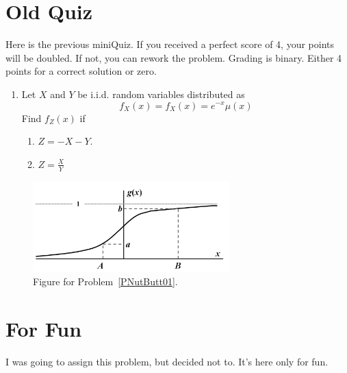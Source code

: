 \documentclass{article}[10pt]
\begin{document}
\section{Old Quiz}

Here is the previous miniQuiz. If you received a perfect score of 4, your points will be doubled. If not, you can rework the problem. Grading is binary. Either 4 points for a correct solution or zero.

\begin{enumerate}
\item
  Let $X$ and $Y$ be i.i.d. random variables distributed as
  $$ f_X(x) = f_X(x) = e^{-x} \mu (x)$$
  Find $f_Z (x)$ if
  \begin{enumerate}
  \item $Z=-X-Y$.
  \item $Z=\frac{X}{Y}$
  \end{enumerate}
\end{enumerate}

\begin{figure}
  \centering
  \includegraphics[width=3in]{pics/PROB.png}
  \caption{Figure for Problem~\ref{PNutButt01}.}
  \label{PNutButt03}
\end{figure}

\section{For Fun}

I was going to assign this problem, but decided not to. It's here only for fun.
\end{document}
